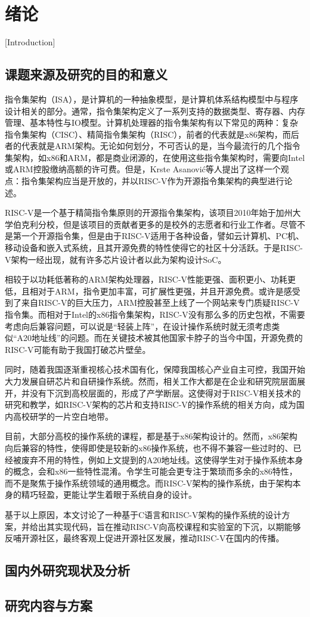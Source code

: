 
\chapter{绪论}[Introduction]

\section{课题来源及研究的目的和意义}

指令集架构（ISA），是计算机的一种抽象模型，是计算机体系结构模型中与程序设计相关的部分。通常，指令集架构定义了一系列支持的数据类型、寄存器、内存管理、基本特性与IO模型。计算机处理器的指令集架构有以下常见的两种：复杂指令集架构（CISC）、精简指令集架构（RISC），前者的代表就是x86架构，而后者的代表就是ARM架构。无论如何划分，不可否认的是，当今最流行的几个指令集架构，如x86和ARM，都是商业闭源的，在使用这些指令集架构时，需要向Intel或ARM控股缴纳高额的许可费。但是，Krste Asanović等人提出了这样一个观点：指令集架构应当是开放的，并以RISC-V作为开源指令集架构的典型进行论述。

RISC-V是一个基于精简指令集原则的开源指令集架构，该项目2010年始于加州大学伯克利分校，但是该项目的贡献者更多的是校外的志愿者和行业工作者。尽管不是第一个开源指令集，但是由于RISC-V适用于各种设备，譬如云计算机、PC机、移动设备和嵌入式系统，且其开源免费的特性使得它的社区十分活跃。于是RISC-V架构一经出现，就有许多芯片设计者以此为架构设计SoC。

相较于以功耗低著称的ARM架构处理器，RISC-V性能更强、面积更小、功耗更低，且相对于ARM，指令更加丰富，可扩展性更强，并且开源免费。或许是感受到了来自RISC-V的巨大压力，ARM控股甚至上线了一个网站来专门质疑RISC-V指令集。而相对于Intel的x86指令集架构，RISC-V没有那么多的历史包袱，不需要考虑向后兼容问题，可以说是“轻装上阵”，在设计操作系统时就无须考虑类似“A20地址线”的问题。而在关键技术被其他国家卡脖子的当今中国，开源免费的RISC-V可能有助于我国打破芯片壁垒。

同时，随着我国逐渐重视核心技术国有化，保障我国核心产业自主可控，我国开始大力发展自研芯片和自研操作系统。然而，相关工作大都是在企业和研究院层面展开，并没有下沉到高校层面的，形成了产学断层。这使得对于RISC-V相关技术的研究和教学，如RISC-V架构的芯片和支持RISC-V的操作系统的相关方向，成为国内高校研学的一片空白地带。

目前，大部分高校的操作系统的课程，都是基于x86架构设计的。然而，x86架构向后兼容的特性，使得即使是较新的x86操作系统，也不得不兼容一些过时的、已经被废弃不用的特性，例如上文提到的A20地址线。这使得学生对于操作系统本身的概念，会和x86一些特性混淆。令学生可能会更专注于繁琐而多余的x86特性，而不是聚焦于操作系统领域的通用概念。而RISC-V架构的操作系统，由于架构本身的精巧轻盈，更能让学生着眼于系统自身的设计。

基于以上原因，本文讨论了一种基于C语言和RISC-V架构的操作系统的设计方案，并给出其实现代码，旨在推动RISC-V向高校课程和实验室的下沉，以期能够反哺开源社区，最终客观上促进开源社区发展，推动RISC-V在国内的传播。

\section{国内外研究现状及分析}



\section{研究内容与方案}